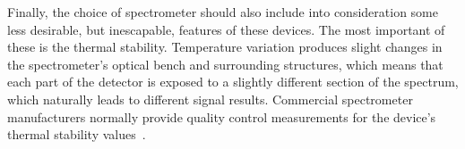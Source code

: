 Finally, the choice of spectrometer should also include into
consideration some less desirable, but inescapable,  features of these
devices. The most important of these is the thermal stability.
Temperature variation produces slight changes in the spectrometer's
optical bench and surrounding structures, which means that each part of
the detector is exposed to a slightly different section of the spectrum,
which naturally leads to different signal results. Commercial
spectrometer manufacturers normally provide quality control measurements
for the device's thermal stability
values~\cite{Merlaud2013, Avantes2022}.
